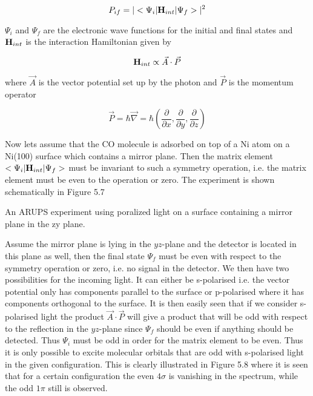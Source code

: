 \begin{equation}
P_{if}=|<\Psi_{i}|{\bf H}_{int}|\Psi_f>|^2
\end{equation}

$\Psi_i$ and $\Psi_f$ are the electronic wave functions for the initial and final states and   ${\bf H}_{int}$ is the interaction Hamiltonian given by
 
\begin{equation}
 {\bf H}_{int}\propto \vec{A}\cdot \vec{P}
\end{equation}
 
where $\vec{A}$ is the vector potential set up by the photon and $\vec{P}$ is the momentum operator

\begin{equation}
\vec{P}=\hbar \vec{\nabla}=\hbar \left(\frac{\partial}{\partial x}, \frac{\partial}{\partial y}, \frac{\partial}{\partial z}\right)
\end{equation}

Now lets assume that the CO molecule is adsorbed on top of a Ni atom on a Ni(100) surface which contains a mirror plane. Then the matrix element $<\Psi_i|{\bf H}_{int}|\Psi_f>$ must be invariant to such a symmetry operation, i.e. the matrix element must be even to the operation or zero. The experiment is shown schematically in Figure 5.7

\vspace*{11cm}

           An ARUPS experiment using poralized light on a surface containing a mirror plane in the zy plane.

\vspace{1cm}

Assume the mirror plane is lying in the $yz$-plane and the detector is located in this plane as well, then the final state  $\Psi_f$ must be even with respect to the symmetry operation or zero, i.e. no signal in the detector. We then have two possibilities for the incoming light. It can either be s-polarised i.e. the vector potential only has components parallel to the surface or p-polarised where it has components orthogonal to the surface. It is then easily seen that if we consider s-polarised light the product $\vec{A}\cdot \vec{P}$ will give a product that will be odd with respect to the reflection in the $yz$-plane since $\Psi_f$ should be even if anything should be detected. Thus $\Psi_i$ must be odd in order for the matrix element to be even. Thus it is only possible to excite molecular orbitals that are odd with s-polarised light in the given configuration. This is clearly illustrated in Figure 5.8 where it is seen that for a certain configuration the even $4\sigma$ is vanishing in the spectrum, while the odd $1\pi$ still is observed.

